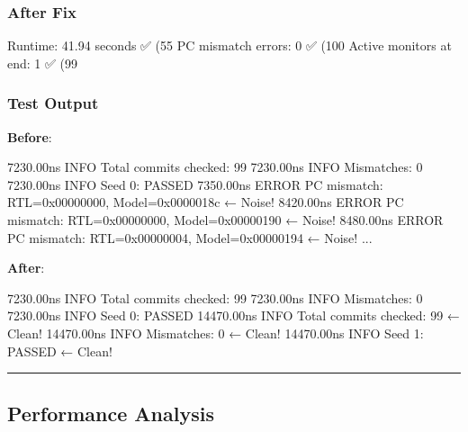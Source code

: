 \subsubsection{After Fix}\label{cr:fix:pc-mismatch-fix:after-fix}

\begin{record}

\begin{textblock}
Runtime: 41.94 seconds ✅ (55%
PC mismatch errors: 0 ✅ (100%
Active monitors at end: 1 ✅ (99%
\end{textblock}

\end{record}

\subsubsection{Test Output}\label{cr:fix:pc-mismatch-fix:test-output}

\begin{record}

\textbf{Before}:

\begin{textblock}
7230.00ns INFO  Total commits checked: 99
7230.00ns INFO  Mismatches: 0
7230.00ns INFO  Seed 0: PASSED
7350.00ns ERROR PC mismatch: RTL=0x00000000, Model=0x0000018c  ← Noise!
8420.00ns ERROR PC mismatch: RTL=0x00000000, Model=0x00000190  ← Noise!
8480.00ns ERROR PC mismatch: RTL=0x00000004, Model=0x00000194  ← Noise!
...
\end{textblock}

\textbf{After}:

\begin{textblock}
7230.00ns INFO  Total commits checked: 99
7230.00ns INFO  Mismatches: 0
7230.00ns INFO  Seed 0: PASSED
14470.00ns INFO Total commits checked: 99  ← Clean!
14470.00ns INFO Mismatches: 0              ← Clean!
14470.00ns INFO Seed 1: PASSED             ← Clean!
\end{textblock}

\begin{center}\rule{0.5\linewidth}{0.5pt}\end{center}

\end{record}

\subsection{Performance Analysis}\label{cr:fix:pc-mismatch-fix:performance-analysis}

